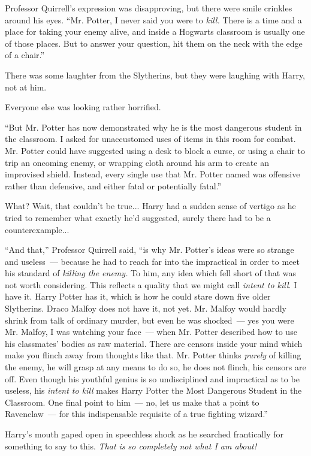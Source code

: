 Professor Quirrell's expression was disapproving, but there were smile crinkles around his eyes. ``Mr. Potter, I never said you were to \emph{kill.} There is a time and a place for taking your enemy alive, and inside a Hogwarts classroom is usually one of those places. But to answer your question, hit them on the neck with the edge of a chair.''

There was some laughter from the Slytherins, but they were laughing with Harry, not at him.

Everyone else was looking rather horrified.

``But Mr. Potter has now demonstrated why he is the most dangerous student in the classroom. I asked for unaccustomed uses of items in this room for combat. Mr. Potter could have suggested using a desk to block a curse, or using a chair to trip an oncoming enemy, or wrapping cloth around his arm to create an improvised shield. Instead, every single use that Mr. Potter named was offensive rather than defensive, and either fatal or potentially fatal.''

What? Wait, that couldn't be true... Harry had a sudden sense of vertigo as he tried to remember what exactly he'd suggested, surely there had to be a counterexample...

``And that,'' Professor Quirrell said, ``is why Mr. Potter's ideas were so strange and useless~--- because he had to reach far into the impractical in order to meet his standard of \emph{killing the enemy.} To him, any idea which fell short of that was not worth considering. This reflects a quality that we might call \emph{intent to kill}. I have it. Harry Potter has it, which is how he could stare down five older Slytherins. Draco Malfoy does not have it, not yet. Mr. Malfoy would hardly shrink from talk of ordinary murder, but even he was shocked~--- yes you were Mr. Malfoy, I was watching your face~--- when Mr. Potter described how to use his classmates' bodies as raw material. There are censors inside your mind which make you flinch away from thoughts like that. Mr. Potter thinks \emph{purely} of killing the enemy, he will grasp at any means to do so, he does not flinch, his censors are off. Even though his youthful genius is so undisciplined and impractical as to be useless, his \emph{intent to kill} makes Harry Potter the Most Dangerous Student in the Classroom. One final point to him~--- no, let us make that a point to Ravenclaw~--- for this indispensable requisite of a true fighting wizard.''

Harry's mouth gaped open in speechless shock as he searched frantically for something to say to this. \emph{That is so completely not what I am about!}

